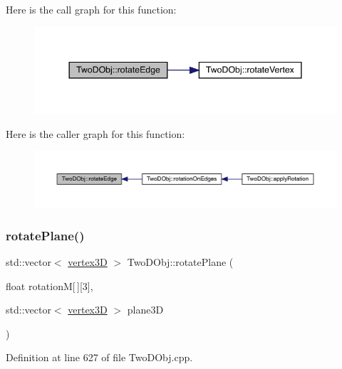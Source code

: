 Here is the call graph for this function\+:
\nopagebreak
\begin{figure}[H]
\begin{center}
\leavevmode
\includegraphics[width=344pt]{class_two_d_obj_af24bd21a8a1319b6d075537e895d7f4f_cgraph}
\end{center}
\end{figure}
Here is the caller graph for this function\+:
\nopagebreak
\begin{figure}[H]
\begin{center}
\leavevmode
\includegraphics[width=350pt]{class_two_d_obj_af24bd21a8a1319b6d075537e895d7f4f_icgraph}
\end{center}
\end{figure}
\mbox{\label{class_two_d_obj_a7981f53246124f8ca4d267a04dfd9c87}} 
\subsubsection{\texorpdfstring{rotate\+Plane()}{rotatePlane()}}
{\footnotesize\ttfamily std\+::vector$<$ \mbox{\hyperlink{structvertex3_d}{vertex3D}} $>$ Two\+D\+Obj\+::rotate\+Plane (\begin{DoxyParamCaption}\item[{float}]{rotationM\mbox{[}$\,$\mbox{]}\mbox{[}3\mbox{]},  }\item[{std\+::vector$<$ \mbox{\hyperlink{structvertex3_d}{vertex3D}} $>$}]{plane3D }\end{DoxyParamCaption})}



Definition at line 627 of file Two\+D\+Obj.\+cpp.

